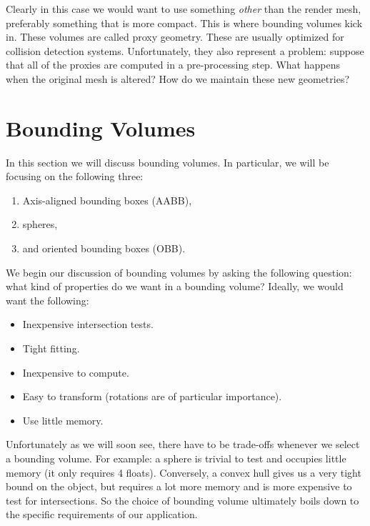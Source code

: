 \documentclass[11pt, letterpaper, oneside]{article}
\begin{document}
        Clearly in this case we would want to use something \emph{other} than
        the render mesh, preferably something that is more compact. This is
        where bounding volumes kick in. These volumes are called proxy geometry.
        These are usually optimized for collision detection systems.
        Unfortunately, they also represent a problem: suppose that all of the
        proxies are computed in a pre-processing step. What happens when the
        original mesh is altered? How do we maintain these new geometries?

    \section{Bounding Volumes}
      In this section we will discuss bounding volumes. In particular, we will
      be focusing on the following three:
      \begin{enumerate}
        \item Axis-aligned bounding boxes (AABB),
        \item spheres,
        \item and oriented bounding boxes (OBB).
      \end{enumerate}

      We begin our discussion of bounding volumes by asking the following
      question: what kind of properties do we want in a bounding volume?
      Ideally, we would want the following:
      \begin{itemize}
        \item Inexpensive intersection tests.
        \item Tight fitting.
        \item Inexpensive to compute.
        \item Easy to transform (rotations are of particular importance).
        \item Use little memory.
      \end{itemize}

      Unfortunately as we will soon see, there have to be trade-offs whenever we
      select a bounding volume. For example: a sphere is trivial to test and
      occupies little memory (it only requires 4 floats). Conversely, a convex
      hull gives us a very tight bound on the object, but requires a lot more
      memory and is more expensive to test for intersections. So the choice of
      bounding volume ultimately boils down to the specific requirements of our
      application.
\end{document}
